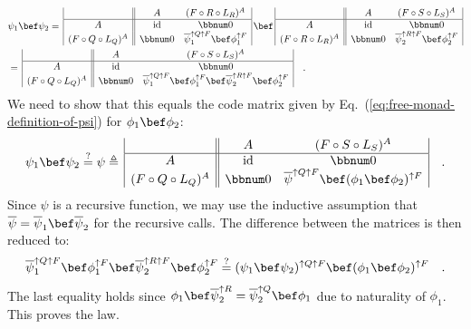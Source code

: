 \begin{align*}
 & \psi_{1}\bef\psi_{2}=\,\begin{array}{|c||cc|}
 & A & (F\circ R\circ L_{R})^{A}\\
\hline A & \text{id} & \bbnum 0\\
(F\circ Q\circ L_{Q})^{A} & \bbnum 0 & \overline{\psi}_{1}^{\uparrow Q\uparrow F}\bef\phi_{1}^{\uparrow F}
\end{array}\,\bef\,\begin{array}{|c||cc|}
 & A & (F\circ S\circ L_{S})^{A}\\
\hline A & \text{id} & \bbnum 0\\
(F\circ R\circ L_{R})^{A} & \bbnum 0 & \overline{\psi}_{2}^{\uparrow R\uparrow F}\bef\phi_{2}^{\uparrow F}
\end{array}\\
 & =\,\begin{array}{|c||cc|}
 & A & (F\circ S\circ L_{S})^{A}\\
\hline A & \text{id} & \bbnum 0\\
(F\circ Q\circ L_{Q})^{A} & \bbnum 0 & \overline{\psi}_{1}^{\uparrow Q\uparrow F}\bef\phi_{1}^{\uparrow F}\bef\overline{\psi}_{2}^{\uparrow R\uparrow F}\bef\phi_{2}^{\uparrow F}
\end{array}\quad.
\end{align*}
We need to show that this equals the code matrix given by Eq.~(\ref{eq:free-monad-definition-of-psi})
for $\phi_{1}\bef\phi_{2}$:
\[
\psi_{1}\bef\psi_{2}\overset{?}{=}\psi\triangleq\,\begin{array}{|c||cc|}
 & A & (F\circ S\circ L_{S})^{A}\\
\hline A & \text{id} & \bbnum 0\\
(F\circ Q\circ L_{Q})^{A} & \bbnum 0 & \overline{\psi}^{\uparrow Q\uparrow F}\bef(\phi_{1}\bef\phi_{2})^{\uparrow F}
\end{array}\quad.
\]
Since $\psi$ is a recursive function, we may use the inductive assumption
that $\overline{\psi}=\overline{\psi}_{1}\bef\overline{\psi}_{2}$
for the recursive calls. The difference between the matrices is then
reduced to:
\[
\overline{\psi}_{1}^{\uparrow Q\uparrow F}\bef\phi_{1}^{\uparrow F}\bef\overline{\psi}_{2}^{\uparrow R\uparrow F}\bef\phi_{2}^{\uparrow F}\overset{?}{=}(\psi_{1}\bef\psi_{2})^{\uparrow Q\uparrow F}\bef(\phi_{1}\bef\phi_{2})^{\uparrow F}\quad.
\]
The last equality holds since $\phi_{1}\bef\overline{\psi}_{2}^{\uparrow R}=\overline{\psi}_{2}^{\uparrow Q}\bef\phi_{1}$
due to naturality of $\phi_{1}$. This proves the law.


